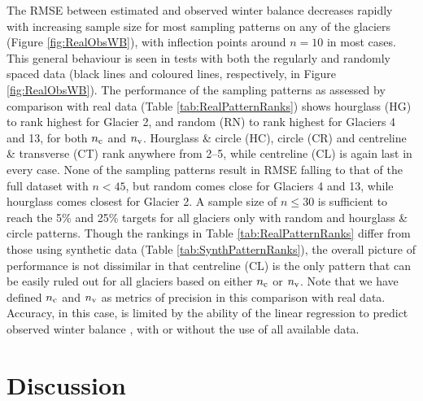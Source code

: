 \documentclass{article}
\begin{document}
The RMSE between estimated and observed winter balance decreases rapidly with increasing sample size for most sampling patterns on any of the glaciers (Figure \ref{fig:RealObsWB}), with inflection points around $n=10$ in most cases. This general behaviour is seen in tests with both the regularly and randomly spaced data (black lines and coloured lines, respectively, in Figure \ref{fig:RealObsWB}).  
The performance of the sampling patterns as assessed by comparison with real data (Table \ref{tab:RealPatternRanks}) shows hourglass (HG) to rank highest for Glacier 2, and random (RN) to rank highest for Glaciers 4 and 13, for both $n_{\rm c}$ and $n_{\rm v}$. Hourglass \& circle (HC), circle (CR) and centreline \& transverse (CT) rank anywhere from 2--5, while centreline (CL) is again last in every case. 
None of the sampling patterns result in RMSE falling to that of the full dataset with $n < 45$, but random comes close for Glaciers 4 and 13, while hourglass comes closest for Glacier 2. A sample size of $n \leq 30$ is sufficient to reach the 5\% and 25\% targets  for all glaciers only with random and hourglass \& circle patterns. 
Though the rankings in Table \ref{tab:RealPatternRanks} differ from those using synthetic data (Table \ref{tab:SynthPatternRanks}), the overall picture of performance is not dissimilar in that centreline (CL) is the only pattern that can be easily ruled out for all glaciers based on either $n_{\rm c}$ or $n_{\rm v}$.  
Note that  we have defined $n_{\rm c}$ and $n_{\rm v}$ as metrics of precision in this comparison with real data. Accuracy, in this case, is limited by the ability of the linear regression to predict observed winter balance \citep[see][]{Pulwicki2017}, with or without the use of all available data. 
    

\section{Discussion}
\end{document}
